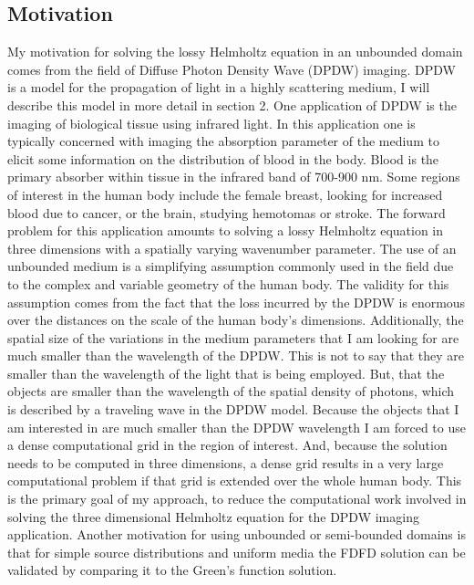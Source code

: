\documentclass [11 pt, titlepage]{article}
\begin{document}
\subsection {Motivation}
\vspace {-4ex}
My motivation for solving the lossy Helmholtz equation in
an unbounded domain comes from the field of Diffuse Photon Density
Wave (DPDW) imaging.  DPDW is a model for the propagation of light in
a highly scattering medium, I will describe this model in more detail
in section 2.  One application of DPDW is the imaging of biological
tissue using infrared light.  In this application one is typically
concerned with imaging the absorption parameter of the medium to
elicit some information on the distribution of blood in the body.
Blood is the primary absorber within tissue in the infrared band of
700-900 nm.  Some regions of interest in the human body include the
female breast, looking for increased blood due to cancer, or the
brain, studying hemotomas or stroke.  The forward problem for this
application amounts to solving a lossy Helmholtz equation in three
dimensions with a spatially varying wavenumber parameter.  The use of
an unbounded medium is a simplifying assumption commonly used in the
field due to the complex and variable geometry of the human body.  The
validity for this assumption comes from the fact that the loss
incurred by the DPDW is enormous over the distances on the scale of
the human body's dimensions.  Additionally, the spatial size of the
variations in the medium parameters that I am looking for are much
smaller than the wavelength of the DPDW. This is not to say that they are
smaller than the wavelength of the light that is being employed.  But,
that the objects are smaller than the wavelength of the spatial
density of photons, which is described by a traveling wave in the DPDW
model.  Because the objects that I am interested in are much smaller
than the DPDW wavelength I am forced to use a dense computational grid
in the region of interest.  And, because the solution needs to be computed
in three dimensions, a dense grid results in a very large
computational problem if that grid is extended over the whole human
body.  This is the primary goal of my approach, to reduce the
computational work involved in solving the three dimensional Helmholtz
equation for the DPDW imaging application.  Another motivation for using
unbounded or semi-bounded domains is that for simple source
distributions and uniform media the FDFD solution can be validated by
comparing it to the Green's function solution.
\end{document}
